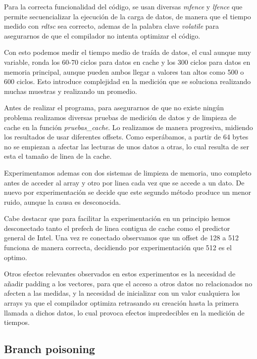 \documentclass[paper=a4, fontsize=11pt]{scrartcl} %
\begin{document}
Para la correcta funcionalidad del código, se usan diversas \textit{mfence} y \textit{lfence} que permite secuencializar la ejecución de la carga de datos, de manera que el tiempo medido con \textit{rdtsc} sea correcto, ademas de la palabra clave \textit{volatile} para asegurarnos de que el compilador no intenta optimizar el código.

Con esto podemos medir el tiempo medio de traída de datos, el cual aunque muy variable, ronda los 60-70 ciclos para datos en cache y los 300 ciclos para datos en memoria principal, aunque pueden ambos llegar a valores tan altos como 500 o 600 ciclos. Esto introduce complejidad en la medición que se soluciona realizando muchas muestras y realizando un promedio.

Antes de realizar el programa, para asegurarnos de que no existe ningún problema realizamos diversas pruebas de medición de datos y de limpieza de cache en la función \textit{pruebas\_cache}. Lo realizamos de manera progresiva, midiendo los resultados de usar diferentes offsets. Como esperábamos, a partir de 64 bytes no se empiezan a afectar las lecturas de unos datos a otras, lo cual resulta de ser esta el tamaño de linea de la cache.

Experimentamos ademas con dos sistemas de limpieza de memoria, uno completo antes de acceder al array y otro por linea cada vez que se accede a un dato. De nuevo por experimentación se decide que este segundo método produce un menor ruido, aunque la causa es desconocida.

Cabe destacar que para facilitar la experimentación en un principio hemos desconectado tanto el prefech de linea contigua de cache como el predictor general de Intel. Una vez re conectado observamos que un offset de 128 a 512 funciona de manera correcta, decidiendo por experimentación que 512 es el optimo.

Otros efectos relevantes observados en estos experimentos es la necesidad de añadir padding a los vectores, para que el acceso a otros datos no relacionados no afecten a las medidas, y la necesidad de inicializar con un valor cualquiera los arrays ya que el compilador optimiza retrasando su creación hasta la primera llamada a dichos datos\cite{cstandar}, lo cual provoca efectos impredecibles en la medición de tiempos.

\subsection{Branch poisoning}
\end{document}
